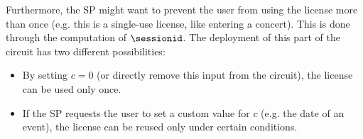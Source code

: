 Furthermore, the SP might want to prevent the user from using the license more than once (e.g. this is a single-use license, like entering a concert). 
This is done through the computation of $\sessionid$. The deployment of this part of the circuit has two different possibilities:

\begin{itemize}
	\item By setting $c = 0$ (or directly remove this input from the circuit), the license can be used only once.
	\item If the SP requests the user to set a custom value for $c$ (e.g. the date of an event), the license can be reused only under certain conditions.
\end{itemize}

